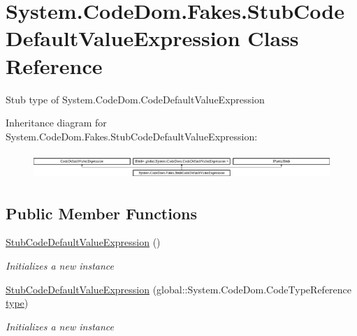 \hypertarget{class_system_1_1_code_dom_1_1_fakes_1_1_stub_code_default_value_expression}{\section{System.\-Code\-Dom.\-Fakes.\-Stub\-Code\-Default\-Value\-Expression Class Reference}
\label{class_system_1_1_code_dom_1_1_fakes_1_1_stub_code_default_value_expression}
}


Stub type of System.\-Code\-Dom.\-Code\-Default\-Value\-Expression 


Inheritance diagram for System.\-Code\-Dom.\-Fakes.\-Stub\-Code\-Default\-Value\-Expression\-:\begin{figure}[H]
\begin{center}
\leavevmode
\includegraphics[height=0.987654cm]{class_system_1_1_code_dom_1_1_fakes_1_1_stub_code_default_value_expression}
\end{center}
\end{figure}
\subsection*{Public Member Functions}
\begin{DoxyCompactItemize}
\item 
\hyperlink{class_system_1_1_code_dom_1_1_fakes_1_1_stub_code_default_value_expression_a0504d04b5df9c07702deba25304086b7}{Stub\-Code\-Default\-Value\-Expression} ()
\begin{DoxyCompactList}\small\item\em Initializes a new instance\end{DoxyCompactList}\item 
\hyperlink{class_system_1_1_code_dom_1_1_fakes_1_1_stub_code_default_value_expression_ae2aba8453846ba4a96f99d86701cd74d}{Stub\-Code\-Default\-Value\-Expression} (global\-::\-System.\-Code\-Dom.\-Code\-Type\-Reference \hyperlink{jquery-1_810_82-vsdoc_8js_a3940565e83a9bfd10d95ffd27536da91}{type})
\begin{DoxyCompactList}\small\item\em Initializes a new instance\end{DoxyCompactList}\end{DoxyCompactItemize}
